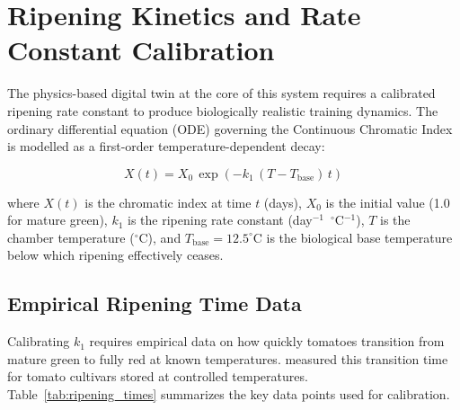 
\section{Ripening Kinetics and Rate Constant Calibration}
    \label{sec:Ripening Kinetics}

    The physics-based digital twin at the core of this system requires a calibrated ripening rate constant to produce biologically realistic training dynamics. The ordinary differential equation (ODE) governing the Continuous Chromatic Index is modelled as a first-order temperature-dependent decay:

    \begin{equation}
        X(t) = X_0 \, \exp\!\left(-k_1 \, (T - T_{\text{base}}) \, t\right)
        \label{eq:ode_ripening}
    \end{equation}

    \noindent where $X(t)$ is the chromatic index at time $t$ (days), $X_0$ is the initial value (1.0 for mature green), $k_1$ is the ripening rate constant (day$^{-1}$~$^{\circ}$C$^{-1}$), $T$ is the chamber temperature ($^{\circ}$C), and $T_{\text{base}} = 12.5^{\circ}$C is the biological base temperature below which ripening effectively ceases.

    \subsection{Empirical Ripening Time Data}

    Calibrating $k_1$ requires empirical data on how quickly tomatoes transition from mature green to fully red at known temperatures. \citet{ogundiwin2022metachronous} measured this transition time for tomato cultivars stored at controlled temperatures. Table~\ref{tab:ripening_times} summarizes the key data points used for calibration.

